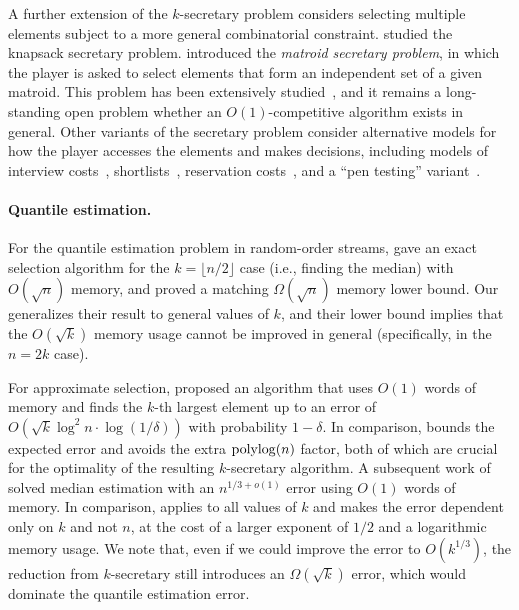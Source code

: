 A further extension of the $k$-secretary problem considers selecting multiple elements subject to a more general combinatorial constraint. \cite{BIKK07} studied the knapsack secretary problem. \cite{BIK07,BIKK18} introduced the \emph{matroid secretary problem}, in which the player is asked to select elements that form an independent set of a given matroid. This problem has been extensively studied~\cite{chakraborty2012improved,soto2013matroid,jaillet2013advances,dinitz2014matroid,lachish2014log, feldman2014simple,huynh2020matroid,soto2021strong,AKKO23}, and it remains a long-standing open problem whether an $O(1)$-competitive algorithm exists in general. Other variants of the secretary problem consider alternative models for how the player accesses the elements and makes decisions, including models of interview costs~\cite{bartoszynski1978secretary}, shortlists~\cite{ASS19}, reservation costs~\cite{burjons2021secretary}, and a ``pen testing'' variant~\cite{QV23,ganesh2023combinatorial}.

\paragraph{Quantile estimation.} For the quantile estimation problem in random-order streams, \cite{MP80} gave an exact selection algorithm for the $k = \lfloor n/2\rfloor$ case (i.e., finding the median) with $O(\sqrt{n})$ memory, and proved a matching $\Omega(\sqrt{n})$ memory lower bound. Our  generalizes their result to general values of $k$, and their lower bound implies that the $O(\sqrt{k})$ memory usage cannot be improved in general (specifically, in the $n = 2k$ case).

For approximate selection, \cite{guha2009stream}  proposed an algorithm that uses $O(1)$ words of memory and finds the $k$-th largest element up to an error of $O(\sqrt{k}\log^2 n\cdot\log(1/\delta))$ with probability $1 - \delta$. In comparison,  bounds the expected error and avoids the extra $\operatorname*{polylog}(n)$ factor, both of which are crucial for the optimality of the resulting $k$-secretary algorithm. A subsequent work of~\cite{MV12} solved median estimation with an $n^{1/3 + o(1)}$ error using $O(1)$ words of memory. In comparison,  applies to all values of $k$ and makes the error dependent only on $k$ and not $n$, at the cost of a larger exponent of $1/2$ and a logarithmic memory usage. We note that, even if we could improve the error to $O(k^{1/3})$, the reduction from $k$-secretary still introduces an $\Omega(\sqrt{k})$ error, which would dominate the quantile estimation error.

